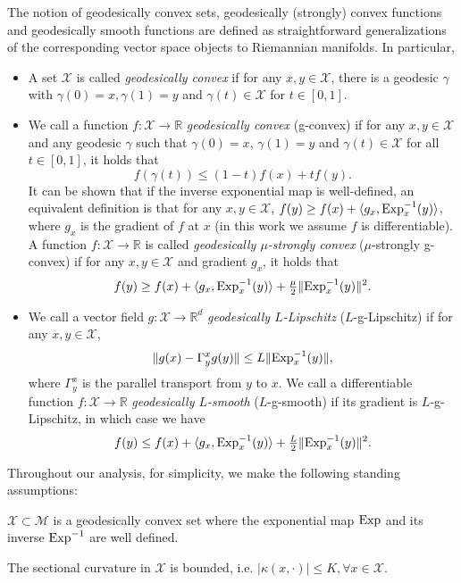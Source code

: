 The notion of geodesically convex sets, geodesically (strongly) convex functions and geodesically smooth functions are defined as straightforward generalizations of the corresponding vector space objects to Riemannian manifolds. In particular,
\begin{itemize}
	\item A set $\mathcal{X}$ is called \emph{geodesically convex} if for any $x,y\in\mathcal{X}$, there is a geodesic $\gamma$ with $\gamma(0) = x, \gamma(1) = y$ and $\gamma(t)\in\mathcal{X}$ for $t\in [0,1]$.
	\item We call a function $f:\mathcal{X}\to\mathbb{R}$ \emph{geodesically convex} (g-convex) if for any $x,y\in\mathcal{X}$ and any geodesic $\gamma$ such that $\gamma(0)=x$, $\gamma(1)=y$ and $\gamma(t)\in\mathcal{X}$ for all $t\in [0,1]$, it holds that
	\[ f(\gamma(t)) \le (1-t)f(x) + tf(y). \]
	It can be shown that if the inverse exponential map is well-defined, an equivalent definition is that for any $x,y\in\mathcal{X}$, $f(y) \ge f(x) + \langle g_x, \mathrm{Exp}_x^{-1}(y) \rangle$,
	where $g_x$ is the gradient of $f$ at $x$ (in this work we assume $f$ is differentiable). A function $f:\mathcal{X}\to\mathbb{R}$ is called \emph{geodesically $\mu$-strongly convex} ($\mu$-strongly g-convex) if for any $x,y\in\mathcal{X}$ and gradient $g_x$, it holds that
	\[ f(y) \ge f(x) + \langle g_x, \mathrm{Exp}_x^{-1}(y) \rangle + \tfrac{\mu}{2}\|\mathrm{Exp}_x^{-1}(y)\|^2.\]
	\item We call a vector field $g :\mathcal{X}\to\mathbb{R}^d$ \emph{geodesically $L$-Lipschitz} ($L$-g-Lipschitz) if for any $x,y\in\mathcal{X}$,
	\[ \|g(x) - \Gamma_y^x g(y)\| \le L \|\mathrm{Exp}_x^{-1}(y)\|, \]
	where $\Gamma_y^x$ is the parallel transport from $y$ to $x$. We call a differentiable function $f:\mathcal{X}\to\mathbb{R}$ \emph{geodesically $L$-smooth} ($L$-g-smooth) if its gradient is $L$-g-Lipschitz, in which case we have
	\[ f(y) \le f(x) + \langle g_x, \mathrm{Exp}_x^{-1}(y) \rangle + \tfrac{L}{2}\|\mathrm{Exp}_x^{-1}(y)\|^2. \]
\end{itemize}
Throughout our analysis, for simplicity, we make the following standing assumptions:
\begin{assumption} \label{assumption:1}
	$\mathcal{X}\subset\mathcal{M}$ is a geodesically convex set where the exponential map $\mathrm{Exp}$ and its inverse $\mathrm{Exp}^{-1}$ are well defined.
\end{assumption} \vspace{-18pt}
\begin{assumption} \label{assumption:2}
	The sectional curvature in $\mathcal{X}$ is bounded, i.e. $|\kappa(x,\cdot)|\le K, \forall x\in\mathcal{X}$.
\end{assumption} \vspace{-18pt}
